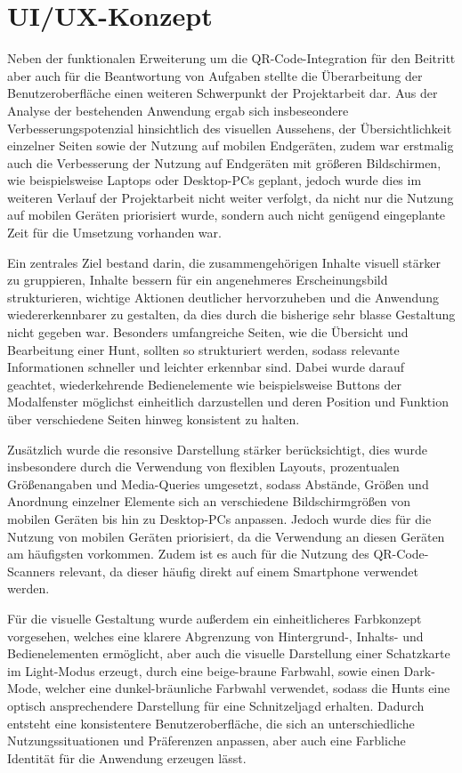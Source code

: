 ﻿\documentclass[oneside]{ausarbeitung}
\begin{document}
\section{UI/UX-Konzept}
\label{sec:uiux-konzept}

Neben der funktionalen Erweiterung um die QR-Code-Integration für den Beitritt aber auch für die Beantwortung von Aufgaben stellte die Überarbeitung
der Benutzeroberfläche einen weiteren Schwerpunkt der Projektarbeit dar. Aus der Analyse der bestehenden Anwendung ergab sich insbeseondere
Verbesserungspotenzial hinsichtlich des visuellen Aussehens, der Übersichtlichkeit einzelner Seiten sowie der Nutzung auf mobilen Endgeräten, zudem 
war erstmalig auch die Verbesserung der Nutzung auf Endgeräten mit größeren Bildschirmen, wie beispielsweise Laptops oder Desktop-PCs geplant,
jedoch wurde dies im weiteren Verlauf der Projektarbeit nicht weiter verfolgt, da nicht nur die Nutzung auf mobilen Geräten priorisiert wurde, sondern 
auch nicht genügend eingeplante Zeit für die Umsetzung vorhanden war.

Ein zentrales Ziel bestand darin, die zusammengehörigen Inhalte visuell stärker zu gruppieren, Inhalte bessern für ein angenehmeres
Erscheinungsbild strukturieren, wichtige Aktionen deutlicher hervorzuheben und die Anwendung wiedererkennbarer zu gestalten, da dies durch die 
bisherige sehr blasse Gestaltung nicht gegeben war. Besonders umfangreiche Seiten, wie die Übersicht und Bearbeitung einer Hunt, sollten so strukturiert
werden, sodass relevante Informationen schneller und leichter erkennbar sind. Dabei wurde darauf geachtet, wiederkehrende Bedienelemente wie 
beispielsweise Buttons der Modalfenster möglichst einheitlich darzustellen und deren Position und Funktion über verschiedene Seiten hinweg 
konsistent zu halten.

Zusätzlich wurde die resonsive Darstellung stärker berücksichtigt, dies wurde insbesondere durch die Verwendung von flexiblen Layouts, prozentualen 
Größenangaben und Media-Queries umgesetzt, sodass Abstände, Größen und Anordnung einzelner Elemente sich an verschiedene Bildschirmgrößen von
mobilen Geräten bis hin zu Desktop-PCs anpassen. Jedoch wurde dies für die Nutzung von mobilen Geräten priorisiert, da die Verwendung an diesen
Geräten am häufigsten vorkommen. Zudem ist es auch für die Nutzung des QR-Code-Scanners relevant, da dieser häufig direkt auf einem Smartphone verwendet
werden.

Für die visuelle Gestaltung wurde außerdem ein einheitlicheres Farbkonzept vorgesehen, welches eine klarere Abgrenzung von Hintergrund-, Inhalts- und
Bedienelementen ermöglicht, aber auch die visuelle Darstellung einer Schatzkarte im Light-Modus erzeugt, durch eine beige-braune Farbwahl,
sowie einen Dark-Mode, welcher eine dunkel-bräunliche Farbwahl verwendet, sodass die Hunts eine optisch ansprechendere Darstellung für eine 
Schnitzeljagd erhalten. Dadurch entsteht eine konsistentere Benutzeroberfläche, die sich an unterschiedliche Nutzungssituationen und Präferenzen 
anpassen, aber auch eine Farbliche Identität für die Anwendung erzeugen lässt.
\end{document}
